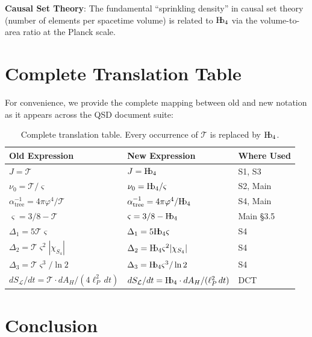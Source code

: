 \documentclass[11pt,a4paper]{article}
\theoremstyle{plain}
\theoremstyle{definition}
\newcommand{\Hb}{\textnormal{H\kern-0.3em b}}
\newcommand{\Hbfour}{\Hb_4}
\newcommand{\Tc}{\mathcal{T}}
\newcommand{\strain}{\varsigma}
\newcommand{\nurad}{\nu_0}
\newcommand{\lp}{\ell_P}
\begin{document}
\textbf{Causal Set Theory}: The fundamental ``sprinkling density'' in causal set theory (number of elements per spacetime volume) is related to $\Hbfour$ via the volume-to-area ratio at the Planck scale.

\section{Complete Translation Table}
\label{sec:translation}

For convenience, we provide the complete mapping between old and new notation as it appears across the QSD document suite:

\begin{table}[h]
\centering
\small
\begin{tabular}{p{4.5cm}p{4.5cm}l}
\toprule
\textbf{Old Expression} & \textbf{New Expression} & \textbf{Where Used} \\
\midrule
$J = \Tc$ & $J = \Hbfour$ & S1, S3 \\
$\nurad = \Tc/\strain$ & $\nurad = \Hbfour/\strain$ & S2, Main \\
$\alpha^{-1}_{\text{tree}} = 4\pi\varphi^4/\Tc$ & $\alpha^{-1}_{\text{tree}} = 4\pi\varphi^4/\Hbfour$ & S4, Main \\
$\strain = 3/8 - \Tc$ & $\strain = 3/8 - \Hbfour$ & Main \S3.5 \\
$\Delta_1 = 5\Tc\strain$ & $\Delta_1 = 5\Hbfour\strain$ & S4 \\
$\Delta_2 = \Tc\strain^2|\chi_{S_4}|$ & $\Delta_2 = \Hbfour\strain^2|\chi_{S_4}|$ & S4 \\
$\Delta_3 = \Tc\strain^3/\ln 2$ & $\Delta_3 = \Hbfour\strain^3/\ln 2$ & S4 \\
$dS_{\mathcal{L}}/dt = \Tc \cdot dA_H/(4\lp^2\,dt)$ & $dS_{\mathcal{L}}/dt = \Hbfour \cdot dA_H/(\lp^2\,dt)$ & DCT \\
\bottomrule
\end{tabular}
\caption{Complete translation table. Every occurrence of $\Tc$ is replaced by $\Hbfour$.}
\label{tab:translation}
\end{table}

\section{Conclusion}
\label{sec:conclusion}
\end{document}
